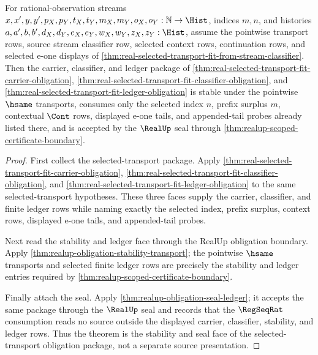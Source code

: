 \begin{theorem}
\label{thm:real-selected-transport-fit-stability-seal-obligation}
For rational-observation streams
$x,x',y,y',p_X,p_Y,t_X,t_Y,m_X,m_Y,o_X,o_Y:\mathbb{N}\to\Hist$,
indices $m,n$, and histories
$a,a',b,b',d_X,d_Y,e_X,e_Y,w_X,w_Y,z_X,z_Y:\Hist$, assume the pointwise
transport rows, source stream classifier row, selected context rows,
continuation rows, and selected e-one displays of
\autoref{thm:real-selected-transport-fit-from-stream-classifier}. Then the
carrier, classifier, and ledger package of
\autoref{thm:real-selected-transport-fit-carrier-obligation},
\autoref{thm:real-selected-transport-fit-classifier-obligation}, and
\autoref{thm:real-selected-transport-fit-ledger-obligation} is stable under the
pointwise $\hsame$ transports, consumes only the selected index $n$, prefix
surplus $m$, contextual $\Cont$ rows, displayed e-one tails, and appended-tail
probes already listed there, and is accepted by the $\RealUp$ seal through
\autoref{thm:realup-scoped-certificate-boundary}.
\end{theorem}
\begin{proof}
First collect the selected-transport package. Apply
\autoref{thm:real-selected-transport-fit-carrier-obligation},
\autoref{thm:real-selected-transport-fit-classifier-obligation}, and
\autoref{thm:real-selected-transport-fit-ledger-obligation} to the same
selected-transport hypotheses. These three faces supply the carrier,
classifier, and finite ledger rows while naming exactly the selected index,
prefix surplus, context rows, displayed e-one tails, and appended-tail probes.

Next read the stability and ledger face through the RealUp obligation boundary.
Apply \autoref{thm:realup-obligation-stability-transport}; the pointwise
$\hsame$ transports and selected finite ledger rows are precisely the stability
and ledger entries required by
\autoref{thm:realup-scoped-certificate-boundary}.

Finally attach the seal. Apply
\autoref{thm:realup-obligation-seal-ledger}; it accepts the
same package through the $\RealUp$ seal and records that the $\RegSeqRat$
consumption reads no source outside the displayed carrier, classifier,
stability, and ledger rows. Thus the theorem is the stability and seal face of
the selected-transport obligation package, not a separate source presentation.
\end{proof}
